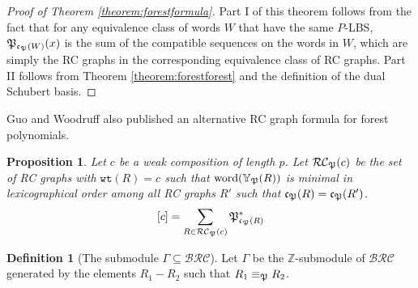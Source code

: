 \documentclass{amsart}
\newtheorem{proposition}[lemma]{Proposition}
\theoremstyle{definition}
\newtheorem{definition}[lemma]{Definition}
\theoremstyle{remark}
\numberwithin{equation}{subsection}
\newcommand{\wtt}{\mathtt{wt}}
\newcommand{\BRC}{\mathcal{BRC}}
\newcommand{\RC}{\mathcal{RC}}
\newcommand{\code}{\mathfrak{c}}
\begin{document}
\begin{proof}[Proof of Theorem \ref{theorem:forestformula}]
  Part I of this theorem follows from the fact that for any equivalence class of words $W$ that have the same $P$-LBS, $\forest_{\code_\forest(W)}(x)$ is the sum of the compatible sequences on the words in $W$, which are simply the RC graphs in the corresponding equivalence class of RC graphs. Part II follows from Theorem \ref{theorem:forestforest} and the definition of the dual Schubert basis.
\end{proof}

Guo and Woodruff \cite{guo2026forest} also published an alternative RC graph formula for forest polynomials.


\begin{proposition}
Let $c$ be a weak composition of length $p$. Let $\RC_\forest(c)$ be the set of RC graphs with $\wtt(R) = c$ such that $\mathrm{word}(\mathbb{Y}_{\mathfrak{P}}(R))$ is minimal in lexicographical order among all RC graphs $R'$ such that $\code_\forest(R)=\code_\forest(R')$.
$$[c] = \sum_{R\in\RC_\forest(c)} \forest_{\code_\forest(R)}^*$$
\end{proposition}

\begin{definition}[The submodule $\Gamma\subseteq \BRC$]
  Let $\Gamma$ be the $\mathbb{Z}$-submodule of $\BRC$ generated by the elements $R_1-R_2$ such that $R_1\equiv_{\mathfrak{P}} R_2$.

\end{definition}
\end{document}
